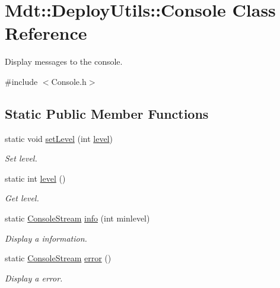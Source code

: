 \hypertarget{class_mdt_1_1_deploy_utils_1_1_console}{}\section{Mdt\+:\+:Deploy\+Utils\+:\+:Console Class Reference}
\label{class_mdt_1_1_deploy_utils_1_1_console}


Display messages to the console.  




{\ttfamily \#include $<$Console.\+h$>$}

\subsection*{Static Public Member Functions}
\begin{DoxyCompactItemize}
\item 
static void \hyperlink{class_mdt_1_1_deploy_utils_1_1_console_a389364a6d53b7361d321bd3aa9408f19}{set\+Level} (int \hyperlink{class_mdt_1_1_deploy_utils_1_1_console_a134e2d7e4a59b3634f007ae09301c684}{level})
\begin{DoxyCompactList}\small\item\em Set level. \end{DoxyCompactList}\item 
static int \hyperlink{class_mdt_1_1_deploy_utils_1_1_console_a134e2d7e4a59b3634f007ae09301c684}{level} ()
\begin{DoxyCompactList}\small\item\em Get level. \end{DoxyCompactList}\item 
static \hyperlink{class_mdt_1_1_deploy_utils_1_1_console_stream}{Console\+Stream} \hyperlink{class_mdt_1_1_deploy_utils_1_1_console_a3ddc9a6338a0fd7d01ca7a60936415b5}{info} (int minlevel)
\begin{DoxyCompactList}\small\item\em Display a information. \end{DoxyCompactList}\item 
static \hyperlink{class_mdt_1_1_deploy_utils_1_1_console_stream}{Console\+Stream} \hyperlink{class_mdt_1_1_deploy_utils_1_1_console_a9398a0a4aebbe2184847b1ed75a40def}{error} ()
\begin{DoxyCompactList}\small\item\em Display a error. \end{DoxyCompactList}\end{DoxyCompactItemize}


